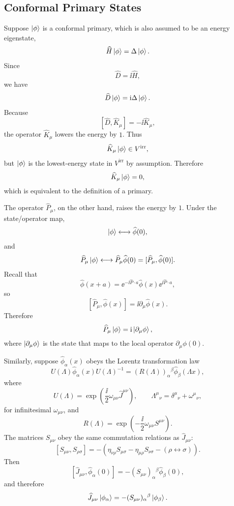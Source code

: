 \subsection{Conformal Primary States}

Suppose \(\ket{\phi}\) is a conformal primary, which is also assumed to
be an energy eigenstate,
\[
  \widehat H\ket{\phi}=\Delta\ket{\phi}.
\]
Since
\[
  \widehat D=\ii\widehat H,
\]
we have
\[
  \widehat D\ket{\phi}=\mathrm{i}\Delta\ket{\phi}.
\]
Because
\[
  [\widehat D,\widehat K_\mu]=-\ii\widehat K_\mu,
\]
the operator \(\widehat K_\mu\) lowers the energy by \(1\).  Thus
\[
  \widehat K_\mu\ket{\phi}\in V^{\mathrm{irr}},
\]
but \(\ket{\phi}\) is the lowest-energy state in \(V^{\mathrm{irr}}\) by
assumption.  Therefore
\[
  \widehat K_\mu\ket{\phi}=0,
\]
which is equivalent to the definition of a primary.

The operator \(\widehat P_\mu\), on the other hand, raises the energy by
\(1\).  Under the state/operator map,
\[
  \ket{\phi}\longleftrightarrow \widehat\phi(0),
\]
and
\[
  \widehat P_\mu\ket{\phi}
  \longleftrightarrow
  \widehat P_\mu\widehat\phi(0)
  =
  [\widehat P_\mu,\widehat\phi(0)].
\]
Recall that
\[
  \widehat\phi(x+a)
  =
  \ee^{-\ii\widehat P\cdot a}
  \widehat\phi(x)
  \ee^{\ii\widehat P\cdot a},
\]
so
\[
  [\widehat P_\mu,\widehat\phi(x)]
  =
  \ii\partial_\mu\widehat\phi(x).
\]
Therefore
\[
  \widehat P_\mu\ket{\phi}
  =
  \mathrm{i}\ket{\partial_\mu\phi},
\]
where \(\ket{\partial_\mu\phi}\) is the state that maps to the local
operator \(\partial_\mu\phi(0)\).

Similarly, suppose \(\widehat\phi_\alpha(x)\) obeys the Lorentz
transformation law
\[
  U(\Lambda)\widehat\phi_\alpha(x)U(\Lambda)^{-1}
  =
  (R(\Lambda))_\alpha{}^\beta
  \widehat\phi_\beta(\Lambda x),
\]
where
\[
  U(\Lambda)
  =
  \exp\left(\frac{\ii}{2}\omega_{\mu\nu}\widehat J^{\mu\nu}\right),
  \qquad
  \Lambda^\mu{}_\nu=\delta^\mu{}_\nu+\omega^\mu{}_\nu,
\]
for infinitesimal \(\omega_{\mu\nu}\), and
\[
  R(\Lambda)
  =
  \exp\left(-\frac{\ii}{2}\omega_{\mu\nu}S^{\mu\nu}\right).
\]
The matrices \(S_{\mu\nu}\) obey the same commutation relations as
\(\widehat J_{\mu\nu}\):
\[
  [S_{\mu\nu},S_{\rho\sigma}]
  =
  -\left(
    \eta_{\nu\rho}S_{\mu\sigma}
    -
    \eta_{\mu\rho}S_{\nu\sigma}
    -(\rho\leftrightarrow\sigma)
  \right).
\]
Then
\[
  [\widehat J_{\mu\nu},\widehat\phi_\alpha(0)]
  =
  -(S_{\mu\nu})_\alpha{}^\beta \widehat\phi_\beta(0),
\]
and therefore
\[
  \widehat J_{\mu\nu}\ket{\phi_\alpha}
  =
  -(S_{\mu\nu})_\alpha{}^\beta \ket{\phi_\beta}.
\]

